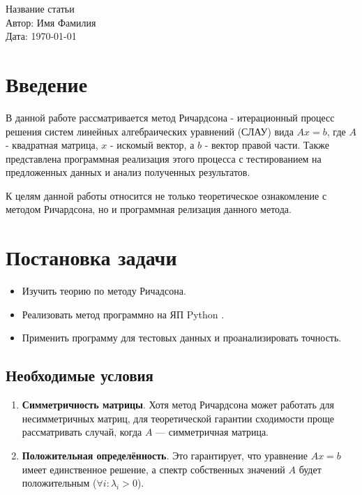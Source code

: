 \documentclass[a4paper,12pt]{article}
\begin{document}
	
	\begin{center}
		{\LARGE Название статьи} \\[1cm]
		{\large Автор: Имя Фамилия} \\[0.5cm]
		{\large Дата: \today}
	\end{center}
	
	\newpage
	
	
	\tableofcontents
	
	\newpage
	\setcounter{page}{3} %

	
	\section*{Введение}
	
	В данной работе рассматривается метод Ричардсона - итерационный процесс решения систем линейных алгебраических уравнений (СЛАУ) вида $Ax = b$, где $A$ - квадратная матрица, $x$ - искомый вектор, а $b$ - вектор правой части. Также представлена программная реализация этого процесса с тестированием на предложенных данных и анализ полученных результатов.
	
	К целям данной работы относится не только теоретическое ознакомление с методом Ричардсона, но и программная релизация данного метода.
	
	\newpage
	
	\section{Постановка задачи}
	\begin{itemize}
		\item Изучить теорию по методу Ричадсона.
		\item Реализовать метод программно на ЯП Python\cite{python} \cite{idris2014learning}.
		\item Применить программу для тестовых данных и проанализировать точность.
	\end{itemize}

	
	\subsection{Необходимые условия}
	\begin{enumerate}
		\item \textbf{Симметричность матрицы}. Хотя метод Ричардсона может работать для несимметричных матриц, для теоретической гарантии сходимости проще рассматривать случай, когда 
		$A$ — симметричная матрица.
		
		\item  \textbf{Положительная определённость}. Это гарантирует, что уравнение 
		$Ax=b$ имеет единственное решение, а спектр собственных значений $A$ будет положительным ($\forall i:\lambda_i > 0$).
	\end{enumerate}
	
\end{document}
